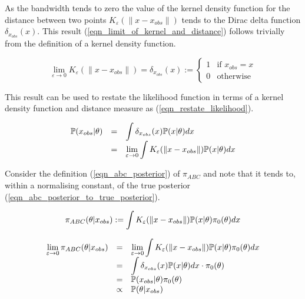 \documentclass[11pt,a4paper]{article}
\newcommand*{\prob}{\mathbb{P}}
\theoremstyle{break}
\begin{document}
  \par As the bandwidth tends to zero the value of the kernel density function for the distance between two points $K_\varepsilon(\|x-x_{obs}\|)$ tends to the Dirac delta function $\delta_{x_{obs}}(x)$. This result (\ref{eqn_limit_of_kernel_and_distance}) follows trivially from the definition of a kernel density function.

  \begin{equation}
    \lim_{\varepsilon\to0}K_{\varepsilon}(\|x-x_{obs}\|)=\delta_{x_{obs}}(x):=\begin{cases}1&\text{if }x_{obs}=x\\0&\text{otherwise}\end{cases} \label{eqn_limit_of_kernel_and_distance}
  \end{equation}

  \par This result can be used to restate the likelihood function in terms of a kernel density function and distance measure as (\ref{eqn_restate_likelihood}).

  \begin{equation} \label{eqn_restate_likelihood}
    \everymath={\displaystyle}
    \begin{array}{rcl}
      \prob(x_{obs}|\theta)&=&\int\delta_{x_{obs}}(x)\prob(x|\theta)dx\\
      &=&\lim_{\varepsilon\to0}\int K_\varepsilon(\|x-x_{obs}\|)\prob(x|\theta)dx
    \end{array}
  \end{equation}

  \par Consider the definition (\ref{eqn_abc_posterior}) of $\pi_{ABC}$ and note that it tends to, within a normalising constant, of the true posterior (\ref{eqn_abc_posterior_to_true_posterior}).

  \begin{equation}\label{eqn_abc_posterior}
    \everymath={\displaystyle}
    \pi_{ABC}(\theta|x_{obs}):=\int K_\varepsilon(\|x-x_{obs}\|)\prob(x|\theta)\pi_0(\theta)dx
  \end{equation}

  \begin{equation}
    \everymath={\displaystyle}\label{eqn_abc_posterior_to_true_posterior}
    \begin{array}{rrl}
      \lim_{\varepsilon\to0}\pi_{ABC}(\theta|x_{obs})&=&\lim_{\varepsilon\to0}\int K_\varepsilon(\|x-x_{obs}\|)\prob(x|\theta)\pi_0(\theta)dx\\
      &=&\int \delta_{x_{obs}}(x)\prob(x|\theta)dx\cdot \pi_0(\theta)\\
      &=&\prob(x_{obs}|\theta)\pi_0(\theta)\\
      &\propto&\prob(\theta|x_{obs})
    \end{array}
  \end{equation}
\end{document}
